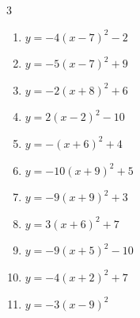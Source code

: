 \begin{multicols}{3}
\begin{enumerate}
  \item $\displaystyle y=-4\left( x-7\right)^{2}-2$

        \phantom{$\displaystyle 頂点\left( 7 , -2 \right)$}

  \item $\displaystyle y=-5\left( x-7\right)^{2}+9$

        \phantom{$\displaystyle 頂点\left( 7 , 9 \right)$}

\columnbreak %

  \item $\displaystyle y=-2\left( x+8\right)^{2}+6$

        \phantom{$\displaystyle 頂点\left( -8 , 6 \right)$}

  \item $\displaystyle y=2\left( x-2\right)^{2}-10$

        \phantom{$\displaystyle 頂点\left( 2 , -10 \right)$}

  \item $\displaystyle y=-\left( x+6\right)^{2}+4$

        \phantom{$\displaystyle 頂点\left( -6 , 4 \right)$}

  \item $\displaystyle y=-10\left( x+9\right)^{2}+5$

        \phantom{$\displaystyle 頂点\left( -9 , 5 \right)$}

  \item $\displaystyle y=-9\left( x+9\right)^{2}+3$

        \phantom{$\displaystyle 頂点\left( -9 , 3 \right)$}

  \item $\displaystyle y=3\left( x+6\right)^{2}+7$

        \phantom{$\displaystyle 頂点\left( -6 , 7 \right)$}

  \item $\displaystyle y=-9\left( x+5\right)^{2}-10$

        \phantom{$\displaystyle 頂点\left( -5 , -10 \right)$}

  \item $\displaystyle y=-4\left( x+2\right)^{2}+7$

        \phantom{$\displaystyle 頂点\left( -2 , 7 \right)$}

  \item $\displaystyle y=-3\left( x-9\right)^{2}$

        \phantom{$\displaystyle 頂点\left( 9 , 0 \right)$}


\end{enumerate}
\end{multicols}
